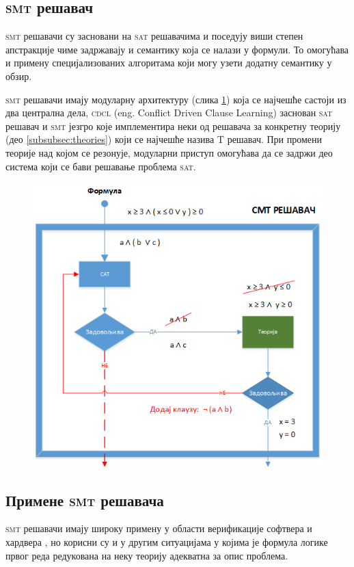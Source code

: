 \documentclass[a4paper]{article}
\begin{document}
\subsection{\textsc{smt} решавач}
\textsc{smt} решавачи су засновани на \textsc{sat} решавачима и поседују виши степен апстракције чиме задржавају и семантику која се
налази у формули. То омогућава и примену специјализованих алгоритама који могу узети додатну семантику у обзир.

\textsc{smt} решавачи имају модуларну архитектуру (слика \ref{fig:smtarch}) која се најчешће састоји из два централна дела,
\textsc{cdcl} (eng. Conflict Driven Clause Learning) заснован \textsc{sat} решавач \cite{satcdcl1, satcdcl2, satcdcl3} и \textsc{smt} језгро
које имплементира неки од решавача за конкретну теорију (део \ref{subsubsec:theories}) који се најчешће назива \textsc{T} решавач.
При промени теорије над којом се резонује, модуларни приступ
омогућава да се задржи део система који се бави решавање проблема \textsc{sat}.

\begin{figure}
    \centering
    \includegraphics[width=.7\linewidth]{./slike/arch.png}
    \label{fig:smtarch}
\end{figure}

\subsection{Примене \textsc{smt} решавача}
\textsc{smt} решавачи имају широку примену у области верификације софтвера и хардвера \cite{smtexample1, smtexample2, smtexample3, smtexample4},
но корисни су и у другим ситуацијама у којима је формула логике првог реда редукована на неку теорију адекватна за опис проблема.
\end{document}
